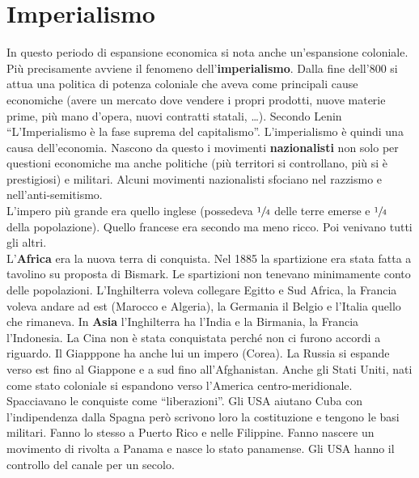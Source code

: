 
\section{Imperialismo}
In questo periodo di espansione economica si nota anche un'espansione coloniale. Più precisamente
avviene il fenomeno dell'\textbf{imperialismo}. Dalla fine dell'800 si attua una politica di
potenza coloniale che aveva come principali cause economiche (avere un mercato dove vendere i
propri prodotti, nuove materie prime, più mano d'opera, nuovi contratti statali, \ldots). Secondo
Lenin ``L'Imperialismo è la fase suprema del capitalismo''. L'imperialismo è quindi una causa 
dell'economia. Nascono da questo i movimenti \textbf{nazionalisti} non solo per questioni economiche
ma anche politiche (più territori si controllano, più si è prestigiosi) e militari. Alcuni movimenti
nazionalisti sfociano nel razzismo e nell'anti-semitismo.\\ [\baselineskip]
L'impero più grande era quello inglese (possedeva $\sfrac{1}{4}$ delle terre emerse e $\sfrac{1}{4}$
della popolazione). Quello francese era secondo ma meno ricco. Poi venivano tutti gli altri.\\
L'\textbf{Africa} era la nuova terra di conquista. Nel 1885 la spartizione era stata fatta a tavolino
su proposta di Bismark. Le spartizioni non tenevano minimamente conto delle popolazioni. 
L'Inghilterra voleva collegare Egitto e Sud Africa, la Francia voleva andare ad est (Marocco e 
Algeria), la Germania il Belgio e l'Italia quello che rimaneva. In \textbf{Asia} l'Inghilterra
ha l'India e la Birmania, la Francia l'Indonesia. La Cina non è stata conquistata perché non ci
furono accordi a riguardo. Il Giapppone ha anche lui un impero (Corea). La Russia si espande verso
est fino al Giappone e a sud fino all'Afghanistan. Anche gli Stati Uniti, nati come stato coloniale
si espandono verso l'America centro-meridionale. Spacciavano le conquiste come ``liberazioni''. Gli
USA aiutano Cuba con l'indipendenza dalla Spagna però scrivono loro la costituzione e tengono le
basi militari. Fanno lo stesso a Puerto Rico e nelle Filippine. Fanno nascere un movimento di rivolta
a Panama e nasce lo stato panamense. Gli USA hanno il controllo del canale per un secolo.
